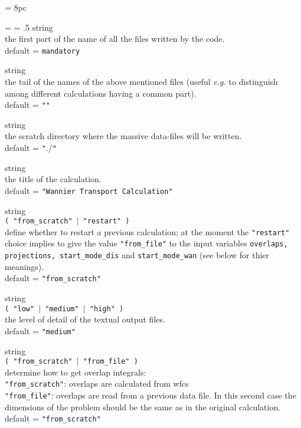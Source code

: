 \newdimen\descindent \descindent = 8pc
{\noindent \leftskip = \descindent \parskip = .5\baselineskip
{}%
{\sc string} \\ the first part of the name of all the files written by
the code.\\ {\sc default} = {\tt mandatory} \par

\noindent{}%
{\sc string} \\ the tail of the names of the above mentioned files (useful {\it e.g.} to
distinguish among different calculations having a common part).\\ 
{\sc default} = {\tt ""} \par

\noindent{}%
{\sc string} \\ the scratch directory where the massive data-files will be written.\\ 
{\sc default} = {\tt "$./$" }\par

\noindent{}%
{\sc string} \\ the title of the calculation.\\ 
{\sc default} = {\tt "Wannier Transport Calculation"} \par

\noindent{}%
{\sc string} \\ {\tt ( "from\_scratch" $\mid$ "restart" ) }\\
define whether to restart a previous calculation;
at the moment the {\tt "restart"} choice implies to give the value
{\tt "from\_file"} to the input 
variables {\tt overlaps, projections,
start\_mode\_dis} and {\tt start\_mode\_wan}
(see below for thier meanings).\\ {\sc default} = {\tt "from\_scratch"} \par

\noindent{}%
{\sc string} \\ {\tt ( "low" $\mid$ "medium" $\mid$ "high" ) }
\\the level of detail of the textual output files.\\ 
{\sc default} = {\tt "medium"} \par

\noindent{}%
{\sc string} \\ {\tt ( "from\_scratch" $\mid$ "from\_file" ) }\\
determine how to get overlap integrals:\\
{\tt "from\_scratch"}:  overlaps are calculated from wfcs\\
{\tt "from\_file"}:     overlaps are read from a previous data file.
In this second case the dimensions of the problem should be the same as in the
original calculation.\\ 
{\sc default} = {\tt "from\_scratch"} \par

}
